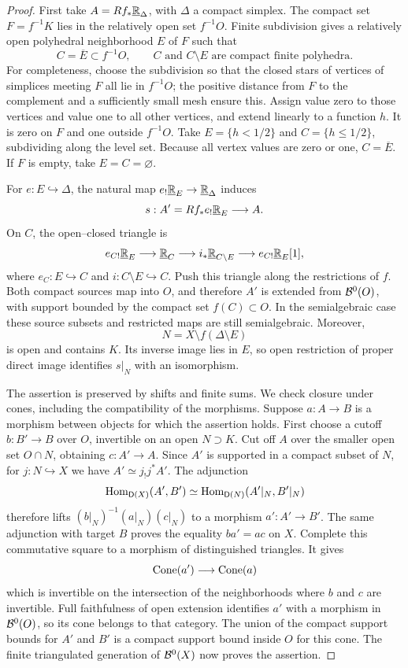 \begin{proof}
First take $A=Rf_*\underline{\mathbb R}_{\Delta}$, with $\Delta$ a compact simplex.
The compact set $F=f^{-1}K$ lies in the relatively open set $f^{-1}O$.
Finite subdivision gives a relatively open polyhedral neighborhood $E$
of $F$ such that
\[
 C=\overline E\subset f^{-1}O,
 \qquad C\text{ and }C\setminus E\text{ are compact finite polyhedra}.
\]
For completeness, choose the subdivision so that the closed stars of
vertices of simplices meeting $F$ all lie in $f^{-1}O$; the positive
distance from $F$ to the complement and a sufficiently small mesh
ensure this.  Assign value zero to those vertices and value one to
all other vertices, and extend linearly to a function $h$.  It is zero
on $F$ and one outside $f^{-1}O$.  Take $E=\{h<1/2\}$ and
$C=\{h\leq1/2\}$, subdividing along the level set.  Because all vertex
values are zero or one, $C=\overline E$.
If $F$ is empty, take $E=C=\varnothing$.

For $e:E\hookrightarrow\Delta$, the natural map
$e_!\underline{\mathbb R}_{E}\to\underline{\mathbb R}_{\Delta}$ induces
\[
 s:A'=Rf_*e_!\underline{\mathbb R}_{E}\longrightarrow A.
\]
On $C$, the open--closed triangle is
\[
 e_{C!}\underline{\mathbb R}_{E}\longrightarrow\underline{\mathbb R}_{C}
 \longrightarrow i_*\underline{\mathbb R}_{C\setminus E}\longrightarrow
 e_{C!}\underline{\mathbb R}_{E}[1],
\]
where $e_C:E\hookrightarrow C$ and $i:C\setminus E\hookrightarrow C$.
Push this triangle along the restrictions of $f$.  Both compact sources
map into $O$, and therefore $A'$ is extended from $\mathcal B^0(O)$, with
support bounded by the compact set $f(C)\subset O$.  In the
semialgebraic case these source subsets and restricted maps are still
semialgebraic.  Moreover,
\[
 N=X\setminus f(\Delta\setminus E)
\]
is open and contains $K$.  Its inverse image lies in $E$, so open
restriction of proper direct image identifies $s|_N$ with an
isomorphism.

The assertion is preserved by shifts and finite sums.  We check closure
under cones, including the compatibility of the morphisms.  Suppose
$a:A\to B$ is a morphism between objects for which the assertion holds.
First choose a cutoff $b:B'\to B$ over $O$, invertible on an open
$N\supset K$.  Cut off $A$ over the smaller open set $O\cap N$, obtaining
$c:A'\to A$.  Since $A'$ is supported in a compact subset of $N$, for
$j:N\hookrightarrow X$ we have $A'\simeq j_!j^*A'$.  The adjunction
\[
 \operatorname{Hom}_{\mathsf D(X)}(A',B')
 \simeq \operatorname{Hom}_{\mathsf D(N)}(A'|_N,B'|_N)
\]
therefore lifts
$(b|_N)^{-1}(a|_N)(c|_N)$ to a morphism $a':A'\to B'$.
The same adjunction with target $B$ proves the equality
$ba'=ac$ on $X$.  Complete this commutative square to a morphism of
distinguished triangles.  It gives
\[
 \operatorname{Cone}(a')\longrightarrow\operatorname{Cone}(a)
\]
which is invertible on the intersection of the neighborhoods where $b$
and $c$ are invertible.  Full faithfulness of open extension identifies
$a'$ with a morphism in $\mathcal B^0(O)$, so its cone belongs to that category.
The union of the compact support bounds for $A'$ and $B'$ is a compact
support bound inside $O$ for this cone.  The finite triangulated
generation of $\mathcal B^0(X)$ now proves the assertion.
\end{proof}

